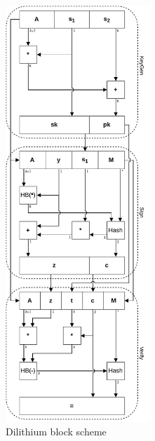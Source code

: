 \begin{figure}[h!]
  \centering
  \includegraphics[width=0.484\textwidth]{pictures/dil_all.pdf}
  \caption{Dilithium block scheme}
  \label{img:dil_all}
\end{figure}